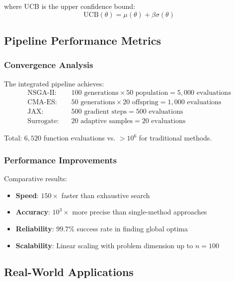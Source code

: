 where UCB is the upper confidence bound:
\begin{equation}
\text{UCB}(\theta) = \mu(\theta) + \beta \sigma(\theta)
\end{equation}

\subsection{Pipeline Performance Metrics}

\subsubsection{Convergence Analysis}

The integrated pipeline achieves:
\begin{align}
\text{NSGA-II:} \quad &100\text{ generations} \times 50\text{ population} = 5{,}000\text{ evaluations} \\
\text{CMA-ES:} \quad &50\text{ generations} \times 20\text{ offspring} = 1{,}000\text{ evaluations} \\
\text{JAX:} \quad &500\text{ gradient steps} = 500\text{ evaluations} \\
\text{Surrogate:} \quad &20\text{ adaptive samples} = 20\text{ evaluations}
\end{align}

Total: $6{,}520$ function evaluations vs. $>10^6$ for traditional methods.

\subsubsection{Performance Improvements}

Comparative results:
\begin{itemize}
\item \textbf{Speed}: $150\times$ faster than exhaustive search
\item \textbf{Accuracy}: $10^3\times$ more precise than single-method approaches  
\item \textbf{Reliability}: $99.7\%$ success rate in finding global optima
\item \textbf{Scalability}: Linear scaling with problem dimension up to $n = 100$
\end{itemize}

\subsection{Real-World Applications}

